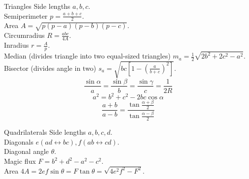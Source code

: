 \begin{algorithm}{Triangles}
\desc
Side lengths $a, b, c$.\\
Semiperimeter $p =\frac{a+b+c}{2}$.\\
Area $A = \sqrt{p(p-a)(p-b)(p-c)}$.\\
Circumradius $R = \frac{abc}{4A}$.\\
Inradius $r = \frac{A}{p}$.\\
Median (divides triangle into two equal-sized triangles) $m_a =
\frac{1}{2}\sqrt{2b^2+2c^2-a^2}$.\\
Bisector (divides angle in two) $s_a = \sqrt{bc\left[1-\left(\frac{a}{b+c}\right)^2\right]}$.
$$\frac{\sin \alpha}{a} = \frac{\sin \beta}{b} = \frac{\sin \gamma}{c} = \frac{1}{2R}$$
$$a^2 = b^2 + c^2 - 2bc\cos \alpha$$
$$\frac{a+b}{a-b}= \frac{\tan\frac{\alpha+\beta}{2}}{\tan\frac{\alpha-\beta}{2}}$$
\end{algorithm}

\begin{algorithm}{Quadrilaterals}
\desc
Side lengths $a, b, c, d$.\\
Diagonals $e (ad \leftrightarrow bc), f (ab \leftrightarrow cd)$.\\
Diagonal angle $\theta$.\\
Magic flux $F = b^2+d^2-a^2-c^2$.\\
Area $4A = 2ef\sin \theta = F\tan \theta = \sqrt{4e^2f^2 - F^2}$.\\

\end{algorithm}

